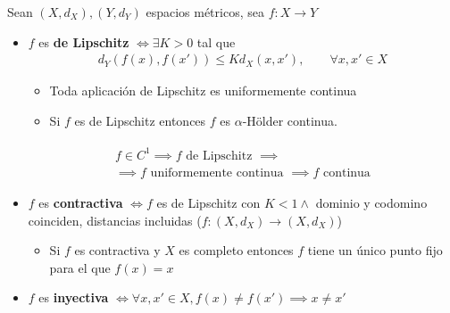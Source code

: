 \documentclass[a4paper,twocolumn]{extarticle}
\begin{document}
Sean $(X, d_X), (Y, d_Y)$ espacios métricos, sea $f:X \to Y$
\begin{itemize}
	\item $f$ es \textbf{de Lipschitz} $\iff \exists K > 0$ tal que
	\begin{align*}
		d_Y(f(x), f(x')) \leq K d_X(x,x'),\qquad \forall x,x' \in X
	\end{align*}
	\begin{itemize}
		\item Toda aplicación de Lipschitz es uniformemente continua
		\item Si $f$ es de Lipschitz entonces $f$ es $\alpha$-Hölder continua.
	\end{itemize}

	\begin{multline*}
	\boxed{
		\begin{array}{c}
		f \in C^1 \implies f \text{ de Lipschitz }\implies\\
		\implies f \text{ uniformemente continua }\implies f\text{ continua}
		\end{array}
	}
	\end{multline*}

	\item $f$ es \textbf{contractiva} $\iff f$ es de Lipschitz con $K < 1 \land$ dominio y codomino coinciden, distancias incluidas ($f:(X, d_X) \to (X, d_X)$)
	\begin{itemize}
		\item Si $f$ es contractiva y $X$ es completo entonces $f$ tiene un único punto fijo para el que $f(x) = x$
	\end{itemize}
	
	\item $f$ es \textbf{inyectiva} $\iff \forall x,x' \in X, f(x) \neq f(x') \implies x \neq x'$
	

\end{itemize}
\end{document}
